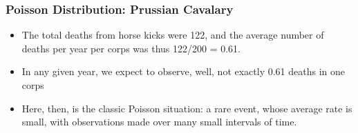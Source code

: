 \documentclass[MASTER.tex]{subfiles}
\begin{document}
\begin{frame}
\frametitle{Poisson Distribution: Prussian Cavalary}
\Large
	\begin{itemize}
\item The total deaths from horse kicks were 122, and the average number of deaths per year per corps was thus 122/200 = 0.61. 
\item In any given year, we expect to observe, well, not exactly 0.61 deaths in one corps 
\item Here, then, is the classic Poisson situation: a rare event, whose average rate is small, with observations made over many small intervals of time.
\end{itemize}
\end{frame}
\end{document}
